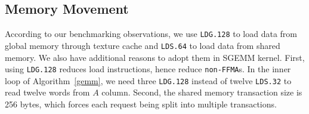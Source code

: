 \subsection{Memory Movement}
According to our benchmarking observations, we use {\tt LDG.128} to load data from global memory through texture cache
and {\tt LDS.64} to load data from shared memory.
We also have additional reasons to adopt them in SGEMM kernel.
First, using {\tt LDG.128} reduces load instructions, hence reduce {\tt non-FFMA}s. %
In the inner loop of Algorithm~\ref{gemm}, we need three {\tt LDG.128} instead of twelve {\tt LDS.32} to read twelve
words from $A$ column.
Second, the shared memory transaction size is 256 bytes, which forces each request being split into multiple transactions.
